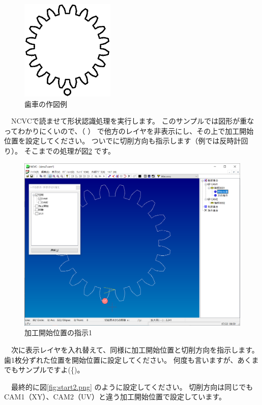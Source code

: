 \begin{figure}[H]
\centering
\includegraphics{No2/fig/sample8-crop.pdf}
\caption{歯車の作図例}
\label{fig:sample8.pdf}
\end{figure}

　NCVCで読ませて形状認識処理を実行します。
このサンプルでは図形が重なってわかりにくいので、（\,\,） で他方のレイヤを非表示にし、その上で加工開始位置を設定してください。
ついでに切削方向も指示します（例では反時計回り）。
そこまでの処理が図\ref{fig:start1.png} です。

\begin{figure}[H]
\centering
\includegraphics[scale=0.5]{No2/fig/start1.png}
\caption{加工開始位置の指示1}
\label{fig:start1.png}
\end{figure}

　次に表示レイヤを入れ替えて、同様に加工開始位置と切削方向を指示します。
歯1枚分ずれた位置を開始位置に設定してください。
何度も言いますが、あくまでもサンプルですよ(^^;)。

　最終的に図\ref{fig:start2.png} のように設定してください。
切削方向は同じでもCAM1（XY）、CAM2（UV）と違う加工開始位置で設定しています。

